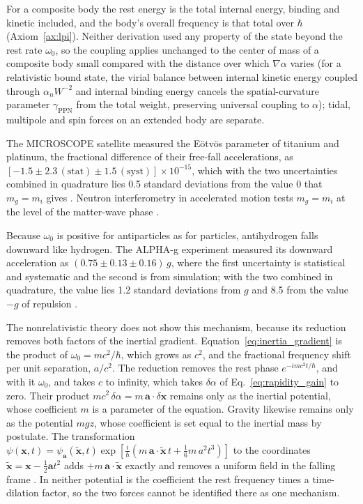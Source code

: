 \documentclass[aps,prd,onecolumn,tightenlines,nofootinbib,notitlepage,11pt,floatfix]{revtex4-2}
\theoremstyle{indentedtheorem}
\begin{document}
For a composite body the rest energy is the total internal energy, binding and kinetic included, and the body's overall frequency is that total over $\hbar$ (Axiom~\ref{ax:lpi}). Neither derivation used any property of the state beyond the rest rate $\omega_0$, so the coupling applies unchanged to the center of mass of a composite body small compared with the distance over which $\nabla\alpha$ varies (for a relativistic bound state, the virial balance between internal kinetic energy coupled through $\alpha_n W^{-2}$ and internal binding energy cancels the spatial-curvature parameter $\gamma_\text{PPN}$ from the total weight, preserving universal coupling to $\alpha$); tidal, multipole and spin forces on an extended body are separate.

The MICROSCOPE satellite measured the E\"otv\"os parameter of titanium and platinum, the fractional difference of their free-fall accelerations, as $[-1.5\pm2.3\,(\text{stat})\pm1.5\,(\text{syst})]\times10^{-15}$, which with the two uncertainties combined in quadrature lies 0.5 standard deviations from the value $0$ that $m_g=m_i$ gives \citep{Touboul2017Microscope,Touboul2022Final}. Neutron interferometry in accelerated motion tests $m_g=m_i$ at the level of the matter-wave phase \citep{Bonse1983Measurement}.

Because $\omega_0$ is positive for antiparticles as for particles, antihydrogen falls downward like hydrogen. The ALPHA-g experiment measured its downward acceleration as $(0.75\pm0.13\pm0.16)\,g$, where the first uncertainty is statistical and systematic and the second is from simulation; with the two combined in quadrature, the value lies 1.2 standard deviations from $g$ and 8.5 from the value $-g$ of repulsion \citep{Anderson2023Observation}.

The nonrelativistic theory does not show this mechanism, because its reduction removes both factors of the inertial gradient. Equation~\eqref{eq:inertia_gradient} is the product of $\omega_0=mc^2/\hbar$, which grows as $c^2$, and the fractional frequency shift per unit separation, $a/c^2$. The reduction removes the rest phase $e^{-imc^2t/\hbar}$, and with it $\omega_0$, and takes $c$ to infinity, which takes $\delta\alpha$ of Eq.~\eqref{eq:rapidity_gain} to zero. Their product $mc^2\,\delta\alpha=m\,\mathbf{a}\cdot\delta\mathbf{x}$ remains only as the inertial potential, whose coefficient $m$ is a parameter of the equation. Gravity likewise remains only as the potential $mgz$, whose coefficient is set equal to the inertial mass by postulate. The transformation $\psi(\mathbf{x},t)=\psi_{\mathbf{a}}(\tilde{\mathbf{x}},t)\exp[\tfrac{i}{\hbar}(m\,\mathbf{a}\cdot\tilde{\mathbf{x}}\,t+\tfrac16 m\,a^2t^3)]$ to the coordinates $\tilde{\mathbf{x}}=\mathbf{x}-\tfrac12\mathbf{a}t^2$ adds $+m\,\mathbf{a}\cdot\tilde{\mathbf{x}}$ exactly and removes a uniform field in the falling frame \citep{Shukla2010Gauge}. In neither potential is the coefficient the rest frequency times a time-dilation factor, so the two forces cannot be identified there as one mechanism.
\end{document}

